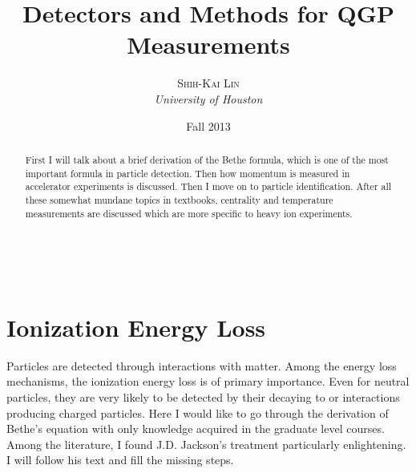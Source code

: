 \documentclass[11pt]{article} %
\title{\textbf{Detectors and Methods for QGP Measurements}}
\author{\textsc{Shih-Kai Lin} %
\\{\textit{University of Houston}}} %
\date{Fall 2013} %
\makeatletter
\renewcommand{\maketitle}{ %
\begin{flushright} %
{\LARGE\@title} %

\vspace{50pt} %

{\large\@author} %
\\\@date %

\vspace{40pt} %
\end{flushright}
}
\makeatother
\begin{document}
\maketitle %



\begin{abstract}
First I will talk about a brief derivation of the Bethe formula, which is one of the most important formula in particle detection. Then how momentum is measured in accelerator experiments is discussed. Then I move on to particle identification. After all these somewhat mundane topics in textbooks, centrality and temperature measurements are discussed which are more specific to heavy ion experiments.
\end{abstract}


\vspace{30pt} %


\section{Ionization Energy Loss}

Particles are detected through interactions with matter. Among the energy loss mechanisms, the ionization energy loss is of primary importance. Even for neutral particles, they are very likely to be detected by their decaying to or interactions producing charged particles. Here I would like to go through the derivation of Bethe's equation with only knowledge acquired in the graduate level courses. Among the literature, I found J.D. Jackson's treatment \cite{jackson98} particularly enlightening. I will follow his text and fill the missing steps.
\end{document}
